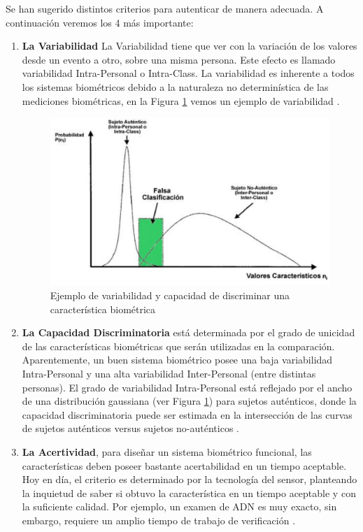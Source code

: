 Se han sugerido distintos criterios para autenticar de manera adecuada. A continuación veremos los 4 más importante:
\begin{enumerate}
\item \textbf{La Variabilidad} La Variabilidad tiene que ver con la variación de los valores desde un evento a otro, sobre una misma persona. Este efecto es llamado variabilidad Intra-Personal o Intra-Class. La variabilidad es inherente a todos los sistemas biométricos debido a la naturaleza no determinística de las mediciones biométricas, en la Figura \ref{la_variabilidad} vemos un ejemplo de variabilidad  \cite{Way00}.\\

\begin{figure}[H]
\centering
\includegraphics[scale=0.3]{images/capitulo2/la_variabilidad.png}
\caption{Ejemplo de variabilidad y capacidad de discriminar una característica biométrica}
\label{la_variabilidad}
\end{figure}


\item \textbf{La Capacidad Discriminatoria}  está determinada por el grado de unicidad de las características biométricas que serán utilizadas en la comparación. Aparentemente, un buen sistema biométrico posee una baja variabilidad Intra-Personal y una alta variabilidad Inter-Personal (entre distintas personas). El grado de variabilidad Intra-Personal está reflejado por el ancho de una distribución gaussiana (ver Figura \ref{la_variabilidad}) para sujetos auténticos, donde la capacidad discriminatoria puede ser estimada en la intersección de las curvas de sujetos auténticos versus sujetos no-auténticos \cite{Zha00}.\\

\item \textbf{La Acertividad}, para diseñar un sistema biométrico funcional, las características deben poseer bastante acertabilidad en un tiempo aceptable. Hoy en día, el criterio es determinado por la tecnología del sensor, planteando la inquietud de saber si obtuvo la característica en un tiempo aceptable y con la suficiente calidad. Por ejemplo, un examen de ADN es muy exacto, sin embargo, requiere un amplio tiempo de trabajo de verificación \cite{Zha00}.



\end{enumerate}
